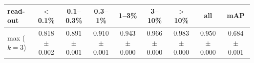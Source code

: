 \begin{tabular}{lcccccccc}
\toprule
read-out & $<$0.1\% & 0.1--0.3\% & 0.3--1\% & 1--3\% & 3--10\% & $>$10\% & all & mAP \\
\midrule
max ($k=3$) & 0.818 $\pm$ 0.002 & 0.891 $\pm$ 0.001 & 0.910 $\pm$ 0.001 & 0.943 $\pm$ 0.000 & 0.966 $\pm$ 0.000 & 0.983 $\pm$ 0.000 & 0.950 $\pm$ 0.000 & 0.684 $\pm$ 0.001 \\
\bottomrule
\end{tabular}

